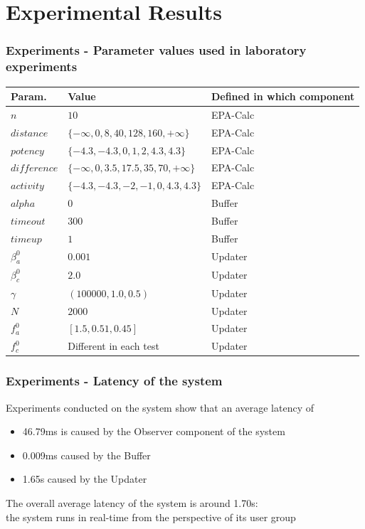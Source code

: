 \documentclass{beamer}
\begin{document}
\section{Experimental Results}
\begin{frame}
\frametitle{Experiments - Parameter values used in laboratory experiments}
\begin{table}
\small
\centering
\begin{tabular}{| l | l | l |}
\hline
\textbf{Param.} & \textbf{Value} & \textbf{Defined in which component} \\ \hline
$n$ & $10$ & EPA-Calc \\ \hline
$distance$ & $\{-\infty, 0, 8, 40, 128, 160, +\infty\}$ & EPA-Calc \\ \hline
$potency$ & $\{-4.3, -4.3, 0, 1, 2, 4.3, 4.3\}$ & EPA-Calc  \\ \hline 
$difference$ & $\{-\infty, 0, 3.5, 17.5, 35, 70, +\infty\}$ & EPA-Calc \\ \hline
$activity$ & $\{-4.3, -4.3, -2, -1, 0, 4.3, 4.3\}$ & EPA-Calc\\ \hline
$alpha$ & $0$ & Buffer \\ \hline
$timeout$ & $300$ & Buffer \\ \hline
$timeup$ & $1$ & Buffer \\ \hline
$\beta_{a}^{0}$ & $0.001$ & Updater \\ \hline
$\beta_{c}^{0}$ & $2.0$ & Updater \\ \hline
$\gamma$ & $(100000, 1.0, 0.5)$ & Updater\\ \hline
$N$ & $2000$ & Updater \\ \hline
$f_a^{0}$ & $[1.5, 0.51, 0.45]$ & Updater \\ \hline
$f_c^{0}$ & Different in each test &Updater \\ \hline
\end{tabular}
\end{table}
\end{frame}


\begin{frame}
\frametitle{Experiments - Latency of the system}
Experiments conducted on the system show that an average latency of 
\begin{itemize} 
\item 46.79ms is caused by the Observer component of the system
\item 0.009ms caused by the Buffer
\item 1.65s caused by the Updater
\end{itemize}
\vspace{.3cm}
The overall average latency of the system is around 1.70s: \\
the system runs in real-time from the perspective of its user group
\end{frame}
\end{document}
